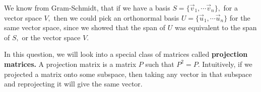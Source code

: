 

We know from Gram-Schmidt, that if we have a basis $S = \{ \vec{v}_{1}, \cdots \vec{v}_{n} \},$ for a vector space $V,$ 
then we could pick an orthonormal basis $U = \{ \vec{u}_{1}, \cdots \vec{u}_{n} \}$ for the same vector space, since we showed that the span of $U$ was equivalent to the span of $S,$ or the vector space $V.$

In this question, we will look into a special class of matrices called \textbf{projection matrices.}
A projection matrix is a matrix $P$ such that $P^{2} = P.$ 
Intuitively, if we projected a matrix onto some subspace, then taking any vector in that subspace and reprojecting it will give the same vector.

